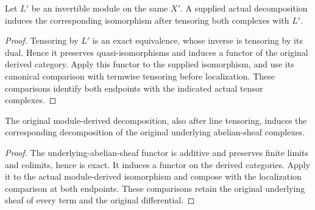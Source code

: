 \begin{lemma}
\label{lem:kn-di-line-tensor}
\leanok
{}
Let $L'$ be an invertible module on the same $X'$.  A supplied actual
decomposition induces the corresponding isomorphism after tensoring
both complexes with $L'$.
\end{lemma}
\begin{proof}
Tensoring by $L'$ is an exact equivalence, whose inverse is tensoring
by its dual.  Hence it preserves quasi-isomorphisms and induces a
functor of the original derived category.  Apply this functor to the
supplied isomorphism, and use its canonical comparison with termwise
tensoring before localization.  These comparisons identify both
endpoints with the indicated actual tensor complexes.
\end{proof}

\begin{lemma}
\label{lem:kn-di-underlying-abelian}
\leanok
{}
The original module-derived decomposition, also after line tensoring,
induces the corresponding decomposition of the original underlying
abelian-sheaf complexes.
\end{lemma}
\begin{proof}
The underlying-abelian-sheaf functor is additive and preserves finite
limits and colimits, hence is exact.  It induces a functor on the
derived categories.  Apply it to the actual module-derived
isomorphism and compose with the localization comparison at both
endpoints.  These comparisons retain the original underlying sheaf
of every term and the original differential.
\end{proof}

